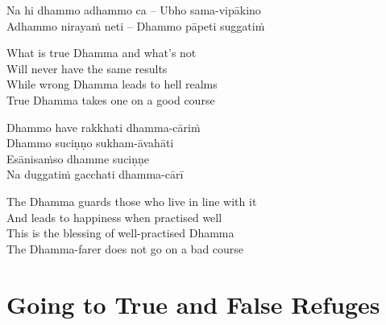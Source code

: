 \suttaRef{[SN 6.2]}

\begin{twochants}
Na hi dhammo adhammo ca – Ubho sama-vipākino\\
Adhammo nirayaṁ neti – Dhammo pāpeti suggatiṁ
\end{twochants}

\begin{english}
  What is true Dhamma and what's
  not\\
  Will never have the same results\\
  While wrong
  Dhamma leads to hell realms\\
  True Dhamma takes one on a good course
\end{english}

  Dhammo have rakkhati dhamma-cāriṁ\\
  Dhammo suciṇṇo sukham-āvahāti\\
  Esānisaṁso dhamme suciṇṇe\\
  Na duggatiṁ gacchati dhamma-cārī

\begin{english}
  The Dhamma guards those who live in line with it\\
  And leads to happiness when practised well\\
  This is the blessing of well-practised Dhamma\\
  The Dhamma-farer does not go on a bad course
\end{english}

\suttaRef{[Thag 4.10]}


\section{Going to True and False Refuges}
\label{true-false-refuges}

\begin{leader}
\end{leader}

